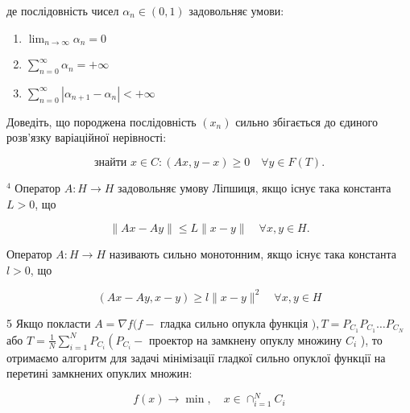 \documentclass[10pt]{article}
\begin{document}
де послідовність чисел $\alpha_{n} \in(0,1)$ задовольняє умови:

\begin{enumerate}
  \item $\lim _{n \rightarrow \infty} \alpha_{n}=0$

  \item $\sum_{n=0}^{\infty} \alpha_{n}=+\infty$

  \item $\sum_{n=0}^{\infty}\left|\alpha_{n+1}-\alpha_{n}\right|<+\infty$

\end{enumerate}

Доведіть, що породжена послідовність $\left(x_{n}\right)$ сильно збігається до єдиного розв'язку варіаційної нерівності:

$$
\text { знайти } x \in C:(A x, y-x) \geq 0 \quad \forall y \in F(T) \text {. }
$$

${ }^{4}$ Оператор $A: H \rightarrow H$ задовольняє умову Ліпшиця, якщо існує така константа $L>0$, що

$$
\|A x-A y\| \leq L\|x-y\| \quad \forall x, y \in H .
$$

Оператор $A: H \rightarrow H$ називають сильно монотонним, якщо існує така константа $l>0$, що

$$
(A x-A y, x-y) \geq l\|x-y\|^{2} \quad \forall x, y \in H
$$

5 Якщо покласти $A=\nabla f(f-$ гладка сильно опукла функція $), T=P_{C_{1}} P_{C_{1}} \ldots P_{C_{N}}$ або $T=\frac{1}{N} \sum_{i=1}^{N} P_{C_{i}}\left(P_{C_{i}}-\right.$ проектор на замкнену опуклу множину $C_{i}$ ), то отримаємо алгоритм для задачі мінімізації гладкої сильно опуклої функції на перетині замкнених опуклих множин:

$$
f(x) \rightarrow \min , \quad x \in \cap_{i=1}^{N} C_{i}
$$
\end{document}
